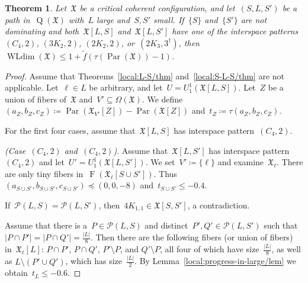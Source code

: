 \documentclass[english,a4paper]{article}
\theoremstyle{plain}
\newtheorem{theorem}             {Theorem}[section]
\theoremstyle{definition}
\newcommand{\abs}[1]{| #1 |}
\DeclareMathOperator{\Fibers}{F}
\newcommand{\coherentConfig}{\ensuremath{\mathfrak{X}}}
\newcommand{\fibers}[1]{\ensuremath{\Fibers \left( #1 \right)}}
\newcommand{\interspace}[2]{\ensuremath{\coherentConfig[#1,#2]}}
\newcommand{\vertices}{\ensuremath{\Omega}}
\DeclareMathOperator*{\WLdim}{WLdim}
\newcommand{\wldim}[1]{\ensuremath{\WLdim\left(#1\right)}}
\DeclareMathOperator*{\Quotient}{Q}
\newcommand{\quotientGraph}[1]{\ensuremath{\Quotient(#1)}}
\newcommand{\equivalenceClasses}[1]{\ensuremath{\mathcal{P}(#1)}}
\newcommand{\f}{f}
\DeclareMathOperator{\parameters}{Par}
\newcommand{\ipfourMatching}{\ensuremath{(\disjointCliques{2}{2},2)}}
\newcommand{\ipfourCycle}   {\ensuremath{(\cycle{4},2)}}
\newcommand{\ipsixMatching}             {\ensuremath{(\disjointCliques{3}{2},2)}}
\newcommand{\ipsixTriangle}               {\ensuremath{(\disjointCliques{2}{3},3^\dag)}}
\newcommand{\clique}[1]{\ensuremath{K_{#1}}}
\newcommand{\cycle}[1]{\ensuremath{C_{#1}}}
\newcommand{\disjointCliques}[2]{\ensuremath{#1 \clique{#2}}}
\newcommand{\matching}[1]{\ensuremath{#1 K_{1,1}}}
\begin{document}
\begin{theorem}
\label{local:S-L-S:rest/thm}
    Let~$\coherentConfig$ be a critical coherent configuration, and let~$(S,L,S')$ be a path in~$\quotientGraph{\coherentConfig}$ with~$L$ large and~$S,S'$ small.
    If~$\{S\}$ and~$\{S'\}$ are not dominating and both~$\interspace{L}{S}$ and~$\interspace{L}{S'}$ have one of the interspace patterns~$\ipfourCycle$, $\ipsixMatching$, $\ipfourMatching$, or~$\ipsixTriangle$,
    then~$\wldim{\coherentConfig} \leq 1 + \widetilde{\f}( \tau(\parameters(\coherentConfig)) - 1)$.
\end{theorem}
\begin{proof}
    Assume that Theorems~\ref{local:L-S/thm} and~\ref{local:S-L-S/thm} are not applicable.
    Let~$\ell \in L$ be arbitrary, and let~$U = U^1_1(\interspace{L}{S})$.
    Let~$Z$ be a union of fibers of~$\coherentConfig$ and~$V' \subseteq \vertices(\coherentConfig)$.
    We define~$(a_Z,b_Z,c_Z) \coloneqq \parameters(\coherentConfig_{V'}[Z]) - \parameters(\coherentConfig[Z])$ and~$t_Z \coloneqq \tau(a_Z,b_Z,c_Z)$.

    For the first four cases, assume that~$\interspace{L}{S}$ has interspace pattern~$\ipfourCycle$.

    \textit{(Case~$\ipfourCycle$ and~$\ipfourCycle$)}.
    Assume that~$\interspace{L}{S'}$ has interspace pattern~$\ipfourCycle$ and let~$U' = U^1_1(\interspace{L}{S'})$.
    We set~$V' \coloneqq \{\ell\}$ and examine~$\coherentConfig_\ell$.
    There are only tiny fibers in~$\fibers{\coherentConfig_\ell[S \cup S']}$.
    Thus~$(a_{S \cup S'},b_{S \cup S'}, c_{S \cup S'}) \preceq (0,0,-8)$ and~$t_{S \cup S'} \leq - 0.4$.

    If~$\equivalenceClasses{L,S} = \equivalenceClasses{L,S'}$, then~$\matching{4}\in\interspace{S}{S'}$, a contradiction.

    Assume that there is a~$P \in \equivalenceClasses{L,S}$ and distinct~$P',Q' \in \equivalenceClasses{L,S'}$ such that~$\abs{P \cap P'} = \abs{P \cap Q'} = \frac{\abs{L}}{8}$.
    Then there are the following fibers (or union of fibers) in~$\coherentConfig_\ell[L]$:
    $P \cap P'$,
    $P \cap Q'$,
    $P' \setminus P$, and
    $Q' \setminus P$, all four of which have size~$\frac{\abs{L}}{8}$, as well as
    $L \setminus (P' \cup Q')$, which has size~$\frac{\abs{L}}{2}$.
    By Lemma~\ref{local:progress-in-large/lem} we obtain~$t_L \leq -0.6$.


\end{proof}
\end{document}
